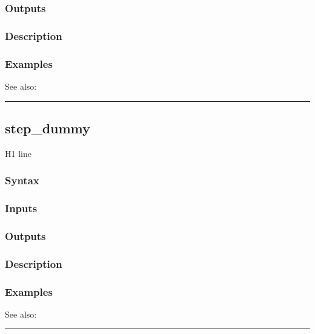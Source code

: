 \documentclass[letterpaper,10pt,english]{sphinxmanual}
\begin{document}
\subsubsection{Outputs}
\label{classes/time_series/@ts/ts:id525}

\subsubsection{Description}
\label{classes/time_series/@ts/ts:id526}

\subsubsection{Examples}
\label{classes/time_series/@ts/ts:id527}
See also:


\bigskip\hrule{}\bigskip



\subsection{step\_dummy}
\label{classes/time_series/@ts/ts:step-dummy}\label{classes/time_series/@ts/ts:id528}
H1 line


\subsubsection{Syntax}
\label{classes/time_series/@ts/ts:id529}

\subsubsection{Inputs}
\label{classes/time_series/@ts/ts:id530}

\subsubsection{Outputs}
\label{classes/time_series/@ts/ts:id531}

\subsubsection{Description}
\label{classes/time_series/@ts/ts:id532}

\subsubsection{Examples}
\label{classes/time_series/@ts/ts:id533}
See also:


\bigskip\hrule{}\bigskip
\end{document}
